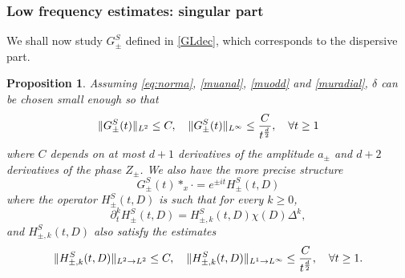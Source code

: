 \documentclass[11pt]{amsart}
\numberwithin{equation}{section}
\newtheorem{prop}{Proposition}[section]
\newtheorem{rem}{Remark}[section]
\begin{document}

  \subsubsection{Low frequency estimates: singular part}
 
 
 We shall now study $G^S_{\pm}$ defined in \eqref{GLdec}, which corresponds to the dispersive part.
 
 \begin{prop}
 \label{propGS}
 Assuming \eqref{eq:norma}, \eqref{muanal}, \eqref{muodd} and  \eqref{muradial},  $\delta$ can be chosen small enough so that
 \begin{equation}
 \label{estGS} \|G^S_{\pm}(t) \|_{L^2}\leq C, \quad \| G^S_{\pm} (t) \|_{L^\infty} \leq {C \over t^{d \over 2}}, \quad \forall t \geq 1
 \end{equation}
 where $C$ depends on at most $ d+  1  $ derivatives of the amplitude $a_\pm$ and $ d+ 2  $ derivatives of the phase $Z_\pm$.
   We also have the more precise structure 
   \begin{equation}
   \label{plusprecis} G^S_{\pm}(t)*_{x} \cdot = e^{\pm i t} H^S_{\pm}(t, D)
   \end{equation}
   where  the operator $H^S_{\pm}(t,D)$ is such that for every $k \geq 0$, 
   \begin{equation}
   \label{higherpm}  \partial_{t}^k H^S_{\pm} (t, D)= H^S_{\pm, k}(t, D) \chi(D) \Delta^k, 
   \end{equation}
   and  $H^S_{\pm, k}(t, D)$ also satisfy the estimates
  \begin{equation}
  \label{estHS}
  \|H^S_{\pm, k}(t, D) \|_{L^2\rightarrow L^2}\leq C, \quad \| H^S_{\pm, k} (t, D) \|_{L^1 \rightarrow L^\infty} \leq {C \over t^{d \over 2} }, \quad \forall t \geq 1.
  \end{equation}
  
 \end{prop}
 
\end{document}
